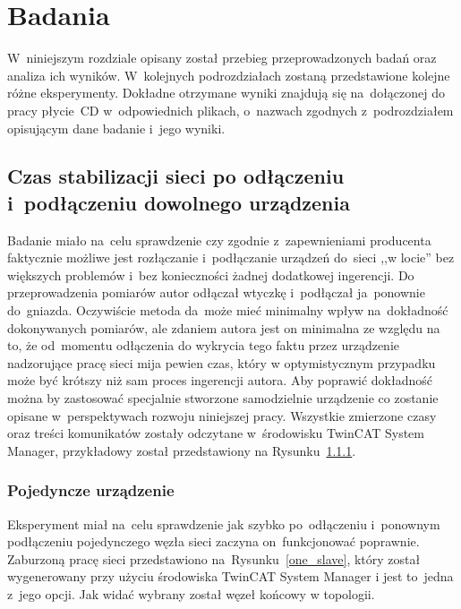 \section{Badania}
W~niniejszym rozdziale opisany został przebieg przeprowadzonych badań oraz analiza ich wyników. W~kolejnych podrozdziałach zostaną przedstawione kolejne różne eksperymenty. Dokładne otrzymane wyniki znajdują się na~dołączonej do pracy płycie~CD w~odpowiednich plikach, o~nazwach zgodnych z~podrozdziałem opisującym dane badanie i~jego wyniki.

\subsection{Czas stabilizacji sieci po odłączeniu i~podłączeniu dowolnego urządzenia}
Badanie miało na~celu sprawdzenie czy zgodnie z~zapewnieniami producenta faktycznie możliwe jest rozłączanie i~podłączanie urządzeń do~sieci ,,w locie'' bez większych problemów i~bez konieczności żadnej dodatkowej ingerencji. Do przeprowadzenia pomiarów autor odłączał wtyczkę i~podłączał ja~ponownie do~gniazda. Oczywiście metoda da~może mieć minimalny wpływ na~dokładność dokonywanych pomiarów, ale zdaniem autora jest on minimalna ze względu na to, że od~momentu odłączenia do wykrycia tego faktu przez urządzenie nadzorujące pracę sieci mija pewien czas, który w optymistycznym przypadku może być krótszy niż sam proces ingerencji autora. Aby poprawić dokładność można by zastosować specjalnie stworzone samodzielnie urządzenie co zostanie opisane w~perspektywach rozwoju niniejszej pracy. Wszystkie zmierzone czasy oraz treści komunikatów zostały odczytane w~środowisku TwinCAT System Manager, przykładowy został przedstawiony na Rysunku~\ref{}.

\subsubsection{Pojedyncze urządzenie}
Eksperyment miał na~celu sprawdzenie jak szybko po~odłączeniu i~ponownym podłączeniu pojedynczego węzła sieci zaczyna on~funkcjonować poprawnie. Zaburzoną pracę sieci przedstawiono na~Rysunku~\ref{one_slave}, który został wygenerowany przy użyciu środowiska TwinCAT System Manager i jest to~jedna z~jego opcji. Jak widać wybrany został węzeł końcowy w topologii.

